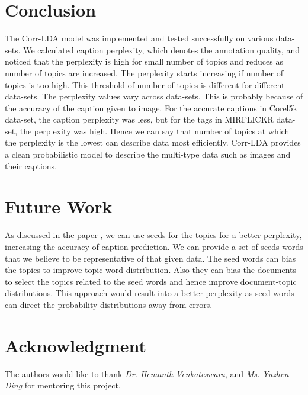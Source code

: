 \documentclass[journal]{IEEEtran}
\begin{document}
\section{Conclusion}
The Corr-LDA model was implemented and tested successfully on various data-sets.
We calculated caption perplexity, which denotes the annotation quality, and noticed that the perplexity is high for small number of topics and reduces as number of topics are increased. The perplexity starts increasing if number of topics is too high. This threshold of number of topics is different for different data-sets. The perplexity values vary across data-sets. This is probably because of the accuracy of the caption given to image. For the accurate captions in Corel5k data-set, the caption perplexity was less, but for the tags in MIRFLICKR data-set, the perplexity was high. Hence we can say that number of topics at which the perplexity is the lowest can describe data most efficiently.
Corr-LDA provides a clean probabilistic model to describe the multi-type data such as images and their captions.

\section{Future Work}
As discussed in the paper \cite{futureWork}, we can use seeds for the topics for a better perplexity, increasing the accuracy of caption prediction.
We can provide a set of seeds words that we believe to be representative of that given data. 
The seed words can bias the topics to improve topic-word distribution. Also they can bias the documents to select the topics related to the seed words and hence improve document-topic distributions.
This approach would result into a better perplexity as seed words can direct the probability distributions away from errors.


\section*{Acknowledgment}
The authors would like to thank \textit{Dr. Hemanth Venkateswara}, and \textit{Ms. Yuzhen Ding} for mentoring this project.

\balance


\end{document}
